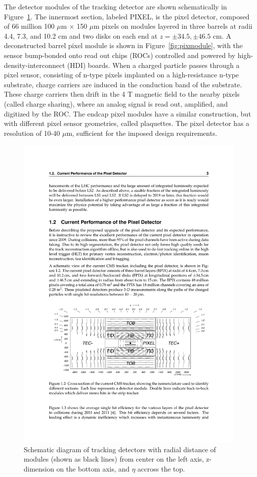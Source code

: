 \indent The detector modules of the tracking detector are shown schematically in Figure~\ref{fig:tracker}. The innermost section, labeled PIXEL, is the pixel detector, composed of 66 million 100 $\mu$m $\times$ 150 $\mu$m pixels on modules layered in three barrels at radii 4.4, 7.3, and 10.2 cm and two disks on each end at $z = \pm34.5, \pm46.5$ cm. A deconstructed barrel pixel module is shown in Figure~\ref{fig:pixmodule}, with the sensor bump-bonded onto read out chips (ROCs) controlled and powered by high-density-interconnect (HDI) boards. When a charged particle passes through a pixel sensor, consisting of n-type pixels implanted on a high-resistance n-type substrate, charge carriers are induced in the conduction band of the substrate. These charge carriers then drift in the 4 T magnetic field to the nearby pixels (called charge sharing), where an analog signal is read out, amplified, and digitized by the ROC. The endcap pixel modules have a similar construction, but with different pixel sensor geometries, called plaquettes. The pixel detector has a resolution of 10-40 $\mu$m, sufficient for the imposed design requirements. 

\begin{figure}[tbh]
\centering
\includegraphics[width=6in]{figures/tracker.pdf}
\caption{Schematic diagram of tracking detectors with radial distance of modules (shown as black lines) from center on the left axis, z-dimension on the bottom axis, and $\eta$ accross the top.}
\label{fig:tracker}
\end{figure}

